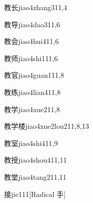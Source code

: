 \begin{verbete}{教长}{jiao4zhang3}{11,4}
\end{verbete}

\begin{verbete}{教导}{jiao4dao3}{11,6}
\end{verbete}

\begin{verbete}{教会}{jiao4hui4}{11,6}
\end{verbete}

\begin{verbete}{教师}{jiao4shi1}{11,6}
\end{verbete}

\begin{verbete}{教官}{jiao4guan1}{11,8}
\end{verbete}

\begin{verbete}{教练}{jiao4lian4}{11,8}
\end{verbete}

\begin{verbete}{教学}{jiao4xue2}{11,8}
\end{verbete}

\begin{verbete}{教学楼}{jiao4xue2lou2}{11,8,13}
\end{verbete}

\begin{verbete}{教室}{jiao4shi4}{11,9}
\end{verbete}

\begin{verbete}{教授}{jiao4shou4}{11,11}
\end{verbete}

\begin{verbete}{教堂}{jiao4tang2}{11,11}
\end{verbete}

\begin{verbete}{接}{jie1}{11}[Radical 手]
\end{verbete}

